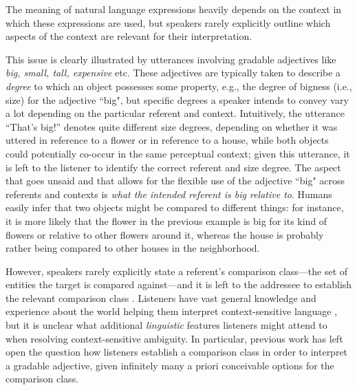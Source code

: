 The meaning of natural language expressions heavily depends on the context in which these expressions are used, but speakers rarely explicitly outline which aspects of the context are relevant for their interpretation. 

This issue is clearly illustrated by utterances involving gradable adjectives like \textit{big, small, tall, expensive} etc. These adjectives are typically taken to describe a \emph{degree} to which an object possesses some property, e.g., the degree of bigness (i.e., size) for the adjective ``big", but specific degrees a speaker intends to convey vary a lot depending on the particular referent and context. Intuitively, the utterance “That’s big!” denotes quite different size degrees, depending on whether it was uttered in reference to a flower or in reference to a house, while both objects could potentially co-occur in the same perceptual context; given this utterance, it is left to the listener to identify the correct referent and size degree. The aspect that goes unsaid and that allows for the flexible use of the adjective ``big" across referents and contexts is \textit{what the intended referent is big relative to}. Humans easily infer that two objects might be compared to different things: for instance, it is more likely that the flower in the previous example is big for its kind of flowers or relative to other flowers around it, whereas the house is probably rather being compared to other houses in the neighborhood. 

However, speakers rarely explicitly state a referent's comparison class---the set of entities the target is compared against---and it is left to the addressee to establish the relevant comparison class \parencite{Solt2009}. Listeners have vast general knowledge and experience about the world helping them interpret context-sensitive language \parencite{tessler2017warm}, but it is unclear what additional \emph{linguistic} features listeners might attend to when resolving context-sensitive ambiguity. 
In particular, previous work has left open the question how listeners establish a comparison class in order to interpret a gradable adjective, given infinitely many a priori conceivable options for the comparison class.

